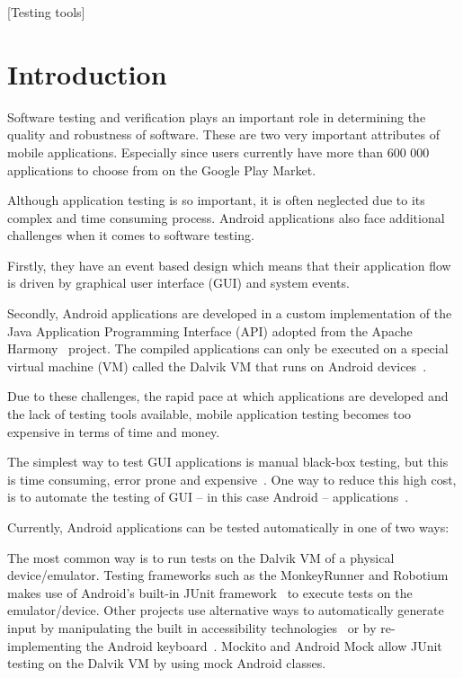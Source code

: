 \documentclass{acm_proc_article-sp}
\begin{document}
[Testing tools]



\section{Introduction}
Software testing and verification plays an important role in determining the quality and robustness of software. These are two very
important attributes of mobile applications. Especially since users currently have more than 600 000 applications to choose from on the
Google Play Market.

Although application testing is so important, it is often neglected due to its complex and time consuming process. Android
applications also face additional challenges when it comes to software testing.

Firstly, they have an event based design which means that their application flow is driven by graphical user interface (GUI) and system
events.

Secondly, Android applications are developed in a custom implementation of the Java Application Programming Interface (API)
 adopted from the Apache Harmony~\cite{harmony} project. The compiled applications can only be executed on a special virtual machine (VM)
called the Dalvik VM that runs on Android devices~\cite{dalvik}.

Due to these challenges, the rapid pace at which applications are developed and the lack of testing tools available, mobile application
testing becomes too expensive in terms of time and money. 

The simplest way to test GUI applications is manual black-box testing, but this is time consuming, error prone
and expensive~\cite{AccessibilityTech}. One way to reduce this high cost, is to 
automate the testing of GUI -- in this case Android -- applications~\cite{AccessibilityTech}.

Currently, Android applications can be tested automatically in one of two ways:

The most common way is to run tests on the Dalvik VM of a physical device/emulator. Testing frameworks such as the MonkeyRunner and
Robotium makes use of Android's built-in JUnit framework~\cite{TestingAndroid} to execute tests on the emulator/device. Other projects use
alternative ways to automatically generate input by manipulating the built in accessibility technologies~\cite{AccessibilityTech} or by
re-implementing the Android keyboard~\cite{KeyboardModel}. Mockito and Android Mock allow JUnit testing on the Dalvik VM by using  mock 
Android classes.
\end{document}
